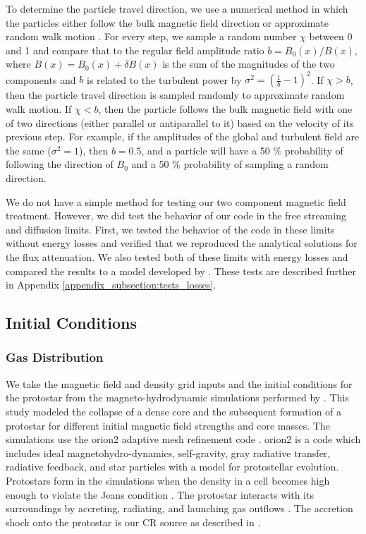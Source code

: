 \documentclass[twocolumn]{aastex63}
\begin{document}
To determine the particle travel direction, we use a numerical method in which the particles either follow the bulk magnetic field direction or approximate random walk motion \citep{fitzaxen_2021_CRs}. For every step, we sample a random number $\chi$ between 0 and 1 and compare that to the regular field amplitude ratio $b=B_0 (x) / B(x) $, where $B(x)=B_0(x)+\delta B(x)$ is the sum of the magnitudes of the two components and $b$ is related to the turbulent power by $\sigma^2=(\frac{1}{b}-1)^2$. If $\chi>b$, then the particle travel direction is sampled randomly to approximate random walk motion. If $\chi<b$, then the particle follows the bulk magnetic field with one of two directions (either parallel or antiparallel to it) based on the velocity of its previous step. For example, if the amplitudes of the global and turbulent field are the same ($\sigma^2=1$), then $b=0.5$, and a particle will have a 50 \% probability of following the direction of $B_0$ and a 50 \% probability of sampling a random direction.

We do not have a simple method for testing our two component magnetic field treatment. However, we did test the behavior of our code in the free streaming and diffusion limits. First, we tested the behavior of the code in these limits without energy losses and verified that we reproduced the analytical solutions for the flux attenuation. We also tested both of these limits with energy losses and compared the results to a model developed by \cite{silsbee_2019_model}. These tests are described further in Appendix \ref{appendix_subsection:tests_losses}.

\subsection{Initial Conditions}
\label{subsection:initial}

\subsubsection{Gas Distribution}
\label{subsubsection:gas}

We take the magnetic field and density grid inputs and the initial conditions for the protostar from the magneto-hydrodynamic simulations performed by \cite{offner_2017_impact}. 
This study modeled the collapse of a dense core and the subsequent formation of a protostar for different initial magnetic field strengths and core masses. The simulations use the {\sc orion2} adaptive mesh refinement code \citep{li_2012_orion}. {\sc orion2} is a code which includes ideal magnetohydro-dynamics, self-gravity, gray radiative transfer, radiative feedback, and star particles with a model for protostellar evolution. Protostars form in the simulations when the density in a cell becomes high enough to violate the Jeans condition \citep{krumholz_2004_sink}. The protostar interacts with its surroundings by accreting, radiating, and launching gas outflows \citep{offner_2009_radiative, krumholz_2004_sink, cunningham_2011_outflows}. The accretion shock onto the protostar is our CR source as described in \cite{gaches_2018_exploration}.
\end{document}
